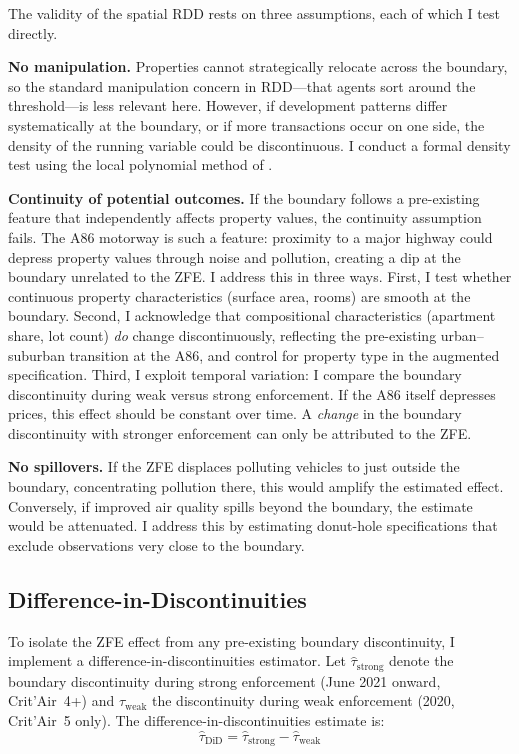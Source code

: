 \documentclass[12pt]{article}
\begin{document}
The validity of the spatial RDD rests on three assumptions, each of which I test directly.

\textbf{No manipulation.} Properties cannot strategically relocate across the boundary, so the standard manipulation concern in RDD---that agents sort around the threshold---is less relevant here. However, if development patterns differ systematically at the boundary, or if more transactions occur on one side, the density of the running variable could be discontinuous. I conduct a formal density test using the local polynomial method of \citet{cattaneo2020density}.

\textbf{Continuity of potential outcomes.} If the boundary follows a pre-existing feature that independently affects property values, the continuity assumption fails. The A86 motorway is such a feature: proximity to a major highway could depress property values through noise and pollution, creating a dip at the boundary unrelated to the ZFE. I address this in three ways. First, I test whether continuous property characteristics (surface area, rooms) are smooth at the boundary. Second, I acknowledge that compositional characteristics (apartment share, lot count) \textit{do} change discontinuously, reflecting the pre-existing urban--suburban transition at the A86, and control for property type in the augmented specification. Third, I exploit temporal variation: I compare the boundary discontinuity during weak versus strong enforcement. If the A86 itself depresses prices, this effect should be constant over time. A \textit{change} in the boundary discontinuity with stronger enforcement can only be attributed to the ZFE.

\textbf{No spillovers.} If the ZFE displaces polluting vehicles to just outside the boundary, concentrating pollution there, this would amplify the estimated effect. Conversely, if improved air quality spills beyond the boundary, the estimate would be attenuated. I address this by estimating donut-hole specifications that exclude observations very close to the boundary.

\subsection{Difference-in-Discontinuities}

To isolate the ZFE effect from any pre-existing boundary discontinuity, I implement a difference-in-discontinuities estimator. Let $\hat{\tau}_{\text{strong}}$ denote the boundary discontinuity during strong enforcement (June 2021 onward, Crit'Air~4+) and $\hat{\tau}_{\text{weak}}$ the discontinuity during weak enforcement (2020, Crit'Air~5 only). The difference-in-discontinuities estimate is:
\begin{equation}
    \hat{\tau}_{\text{DiD}} = \hat{\tau}_{\text{strong}} - \hat{\tau}_{\text{weak}}
    \label{eq:did}
\end{equation}
\end{document}
